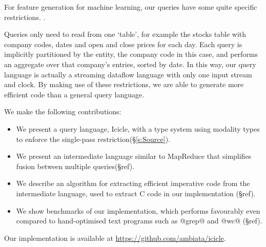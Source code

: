 For feature generation for machine learning, our queries have some quite specific restrictions.
.

Queries only need to read from one `table', for example the stocks table with company codes, dates and open and close prices for each day.
Each query is implicitly partitioned by the entity, the company code in this case, and performs an aggregate over that company's entries, sorted by date.
In this way, our query language is actually a streaming dataflow language with only one input stream and clock.
By making use of these restrictions, we are able to generate more efficient code than a general query language.

We make the following contributions:
\begin{itemize}
\item 
We present a query language, Icicle, with a type system using modality types to enforce the single-pass restriction(\S\ref{s:Source}).
\item
We present an intermediate language similar to MapReduce that simplifies fusion between multiple queries(\S ref).
\item
We describe an algorithm for extracting efficient imperative code from the intermediate language, used to extract C code in our implementation (\S ref).
\item
We show benchmarks of our implementation, which performs favourably even compared to hand-optimised text programs such as @grep@ and @wc@ (\S ref).
\end{itemize}

Our implementation is available at \url{https://github.com/ambiata/icicle}.

